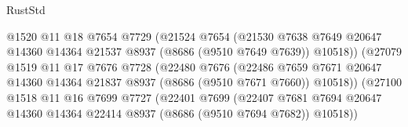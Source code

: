 \begin{lexlean}{RustStd}
\begin{coremodule}
                                      @1520
                                      @11
                                      @18
                                      @7654
                                      @7729
                                      (@21524
                                        @7654
                                        (@21530
                                          @7638
                                          @7649
                                          @20647
                                          @14360
                                          @14364
                                          @21537
                                          @8937
                                          (@8686 (@9510 @7649 @7639))
                                          @10518))
                                      (@27079
                                        @1519
                                        @11
                                        @17
                                        @7676
                                        @7728
                                        (@22480
                                          @7676
                                          (@22486
                                            @7659
                                            @7671
                                            @20647
                                            @14360
                                            @14364
                                            @21837
                                            @8937
                                            (@8686 (@9510 @7671 @7660))
                                            @10518))
                                        (@27100
                                          @1518
                                          @11
                                          @16
                                          @7699
                                          @7727
                                          (@22401
                                            @7699
                                            (@22407
                                              @7681
                                              @7694
                                              @20647
                                              @14360
                                              @14364
                                              @22414
                                              @8937
                                              (@8686 (@9510 @7694 @7682))
                                              @10518))

\end{coremodule}
\end{lexlean}
